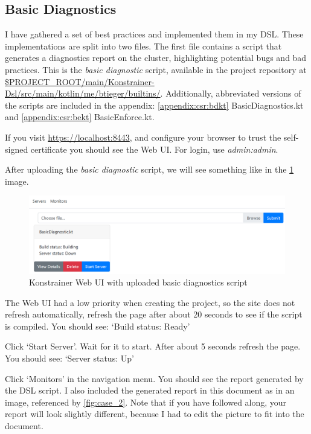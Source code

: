 \subsection{Basic Diagnostics}

I have gathered a set of best practices and implemented them in my DSL. These implementations are split into two files. The first file contains a script that generates a diagnostics report on the cluster, highlighting potential bugs and bad practices. This is the \emph{basic diagnostic} script, available in the project repository at \url{$PROJECT_ROOT/main/Konstrainer-Dsl/src/main/kotlin/me/btieger/builtins/}. Additionally, abbreviated versions of the scripts are included in the appendix: \ref{appendix:csr:bdkt} BasicDiagnostics.kt and \ref{appendix:csr:bekt} BasicEnforce.kt.

If you visit \url{https://localhost:8443}, and configure your browser to trust the self-signed certificate you should see the Web UI. For login, use \emph{admin:admin}. 

After uploading the \emph{basic diagnostic} script, we will see something like in the \ref{fig:case_1} image.

\begin{figure}[h]
  \centering
  \includegraphics[width=140mm, keepaspectratio]{content/30_caseStudy1/main_menu_with_uploaded_building_dagnotics.png}
  \caption{Konstrainer Web UI with uploaded basic diagnostics script}
  \label{fig:case_1}
\end{figure}

The Web UI had a low priority when creating the project, so the site does not refresh automatically, refresh the page after about 20 seconds to see if the script is compiled. You should see: `Build status: Ready'

Click `Start Server'. Wait for it to start. After about 5 seconds refresh the page. You should see: `Server status: Up'

Click `Monitors' in the navigation menu. You should see the report generated by the DSL script. I also included the generated report in this document as in an image, referenced by \ref{fig:case_2}. Note that if you have followed along, your report will look slightly different, because I had to edit the picture to fit into the document.


